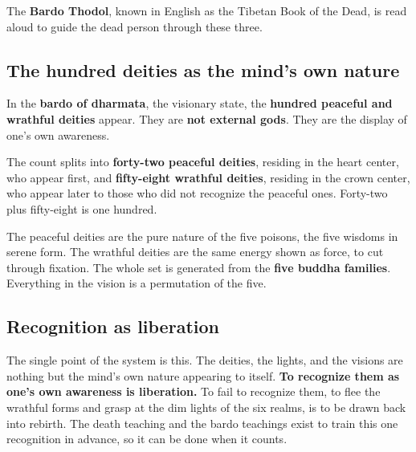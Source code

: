 The \textbf{Bardo Thodol}, known in English as the Tibetan Book of the Dead, is read aloud to guide the dead person through these three.

\subsection{The hundred deities as the mind's own nature}

In the \textbf{bardo of dharmata}, the visionary state, the \textbf{hundred peaceful and wrathful deities} appear. They are \textbf{not external gods}. They are the display of one's own awareness.

The count splits into \textbf{forty-two peaceful deities}, residing in the heart center, who appear first, and \textbf{fifty-eight wrathful deities}, residing in the crown center, who appear later to those who did not recognize the peaceful ones. Forty-two plus fifty-eight is one hundred.

The peaceful deities are the pure nature of the five poisons, the five wisdoms in serene form. The wrathful deities are the same energy shown as force, to cut through fixation. The whole set is generated from the \textbf{five buddha families}. Everything in the vision is a permutation of the five.

\subsection{Recognition as liberation}

The single point of the system is this. The deities, the lights, and the visions are nothing but the mind's own nature appearing to itself. \textbf{To recognize them as one's own awareness is liberation.} To fail to recognize them, to flee the wrathful forms and grasp at the dim lights of the six realms, is to be drawn back into rebirth. The death teaching and the bardo teachings exist to train this one recognition in advance, so it can be done when it counts.
